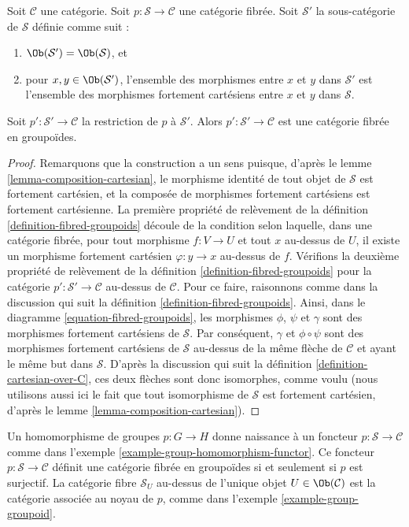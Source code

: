 \begin{lemma}
\label{lemma-fibred-gives-fibred-groupoids}
Soit $\mathcal{C}$ une catégorie.
Soit $p : \mathcal{S} \to \mathcal{C}$ une catégorie fibrée.
Soit $\mathcal{S}'$ la sous-catégorie de $\mathcal{S}$ définie
comme suit :
\begin{enumerate}
\item $\Ob(\mathcal{S}') = \Ob(\mathcal{S})$, et
\item pour $x, y \in \Ob(\mathcal{S}')$, l'ensemble des morphismes entre $x$
et $y$ dans $\mathcal{S}'$ est l'ensemble des morphismes fortement cartésiens entre
$x$ et $y$ dans $\mathcal{S}$.
\end{enumerate}
Soit $p' : \mathcal{S}' \to \mathcal{C}$ la restriction de $p$
à $\mathcal{S}'$. Alors $p' : \mathcal{S}' \to \mathcal{C}$ est une catégorie
fibrée en groupoïdes.
\end{lemma}

\begin{proof}
Remarquons que la construction a un sens puisque, d'après le
lemme \ref{lemma-composition-cartesian},
le morphisme identité de tout objet de $\mathcal{S}$ est fortement cartésien,
et la composée de morphismes fortement cartésiens est fortement cartésienne.
La première propriété de relèvement de la
définition \ref{definition-fibred-groupoids}
découle de la condition selon laquelle, dans une catégorie fibrée,
pour tout morphisme $f : V \to U$ et tout $x$ au-dessus de $U$, il existe
un morphisme fortement cartésien $\varphi : y \to x$ au-dessus de $f$.
Vérifions la deuxième propriété de relèvement de la
définition \ref{definition-fibred-groupoids}
pour la catégorie $p' : \mathcal{S}' \to \mathcal{C}$ au-dessus de $\mathcal{C}$.
Pour ce faire, raisonnons comme dans la discussion qui suit la
définition \ref{definition-fibred-groupoids}.
Ainsi, dans le diagramme \ref{equation-fibred-groupoids}, les
morphismes $\phi$, $\psi$ et $\gamma$ sont des morphismes fortement cartésiens
de $\mathcal{S}$.
Par conséquent, $\gamma$ et $\phi \circ \psi$ sont des morphismes fortement cartésiens
de $\mathcal{S}$ au-dessus de la même flèche de $\mathcal{C}$ et
ayant le même but dans $\mathcal{S}$. D'après la discussion qui suit la
définition \ref{definition-cartesian-over-C},
ces deux flèches sont donc isomorphes, comme voulu (nous utilisons aussi ici
le fait que tout isomorphisme de $\mathcal{S}$ est fortement cartésien, d'après le
lemme \ref{lemma-composition-cartesian}).
\end{proof}

\begin{example}
\label{example-group-homomorphism-fibreedingroupoids}
Un homomorphisme de groupes $p : G \to H$ donne naissance à un foncteur
$p : \mathcal{S}\to\mathcal{C}$ comme dans l'exemple
\ref{example-group-homomorphism-functor}. Ce foncteur
$p : \mathcal{S}\to\mathcal{C}$ définit une catégorie fibrée en groupoïdes si et seulement si
$p$ est surjectif. La catégorie fibre $\mathcal{S}_U$ au-dessus de l'unique
objet $U\in \Ob(\mathcal{C})$ est la catégorie associée au
noyau de $p$, comme dans l'exemple \ref{example-group-groupoid}.
\end{example}

